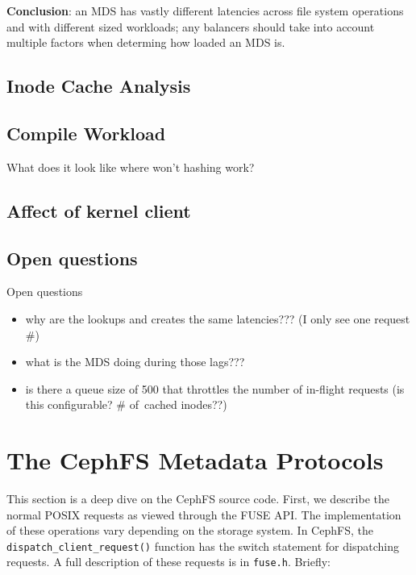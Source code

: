\documentclass[conference]{acm_proc_article-sp} \usepackage[english]{babel}
\begin{document}
\noindent\textbf{Conclusion}: an MDS has vastly different latencies across file
system operations and with different sized workloads; any balancers should take
into account multiple factors when determing how loaded an MDS is.

\subsection{Inode Cache Analysis}

\subsection{Compile Workload}


What does it look like where won't hashing work?

\subsection{Affect of kernel client}

\subsection{Open questions}

Open questions \begin{itemize} \item why are the lookups and creates the same
latencies??? (I only see one request \#) \item what is the MDS doing during
those lags???  \item is there a queue size of 500 that throttles the number of
in-flight requests (is this configurable? \# of\ cached inodes??) \end{itemize}

\section{The CephFS Metadata Protocols}
\label{the-cephfs-metadata-protocols}

This section is a deep dive on the CephFS source code. First, we describe the
normal POSIX requests as viewed through the FUSE API.  The implementation of
these operations vary depending on the storage system. In CephFS, the
\texttt{dispatch\_client\_request()} function has the switch statement for
dispatching requests.  A full description of these requests is in
\texttt{fuse.h}. Briefly:
\end{document}
